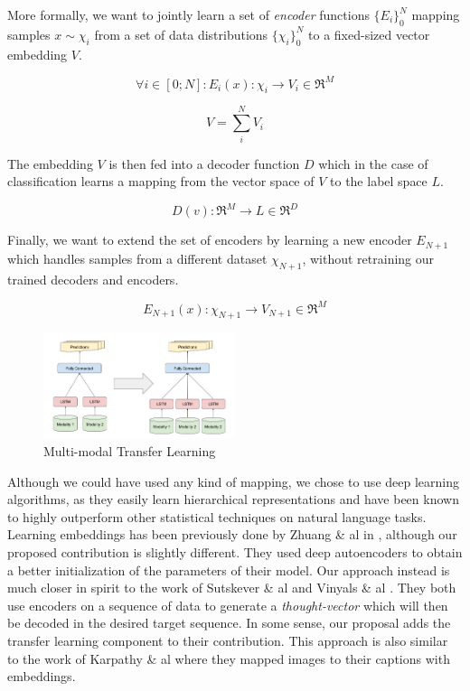 \documentclass[12pt]{article}
\begin{document}
More formally, we want to jointly learn a set of \emph{encoder}
functions $\{E_i\}_0^N$ mapping samples $x \sim \chi_i$ from a set of
data distributions $\{\chi_i\}_0^N$ to a fixed-sized vector embedding
$V$.

\[ \forall i \in [0; N]: E_i(x): \chi_i \rightarrow V_i \in \Re^M\]

\[V = \sum_i^N V_i\]

The embedding $V$ is then fed into a decoder function $D$ which in the
case of classification learns a mapping from the vector space of $V$ to
the label space $L$.

\[ D(v): \Re^M \rightarrow L \in \Re^D\]

Finally, we want to extend the set of encoders by learning a new encoder
$E_{N+1}$ which handles samples from a different dataset $\chi_{N+1}$,
without retraining our trained decoders and encoders.

\[ E_{N+1}(x): \chi_{N+1} \rightarrow V_{N+1} \in \Re^M\]

\begin{figure}[htbp]
\centering
\includegraphics[width=0.5\textwidth]{figures/multimodal.png}
\caption{Multi-modal Transfer Learning}
\end{figure}

Although we could have used any kind of mapping, we chose to use deep
learning algorithms, as they easily learn hierarchical representations
and have been known to highly outperform other statistical techniques on
natural language tasks. Learning embeddings has been previously done by Zhuang \& al in 
\cite{zhuang2015supervised}, although our proposed contribution is
slightly different. They used deep autoencoders to
obtain a better initialization of the parameters of their model. Our
approach instead is much closer in spirit to the work of Sutskever \& al
\cite{sutskever2014sequence} and Vinyals \& al \cite{vinyals2015grammar}. They
both use encoders on a sequence of data to generate a
\emph{thought-vector} which will then be decoded in the desired target
sequence. In some sense, our proposal adds the transfer learning
component to their contribution. This approach is also similar to the
work of Karpathy \& al \cite{karpathy2014deep} where they mapped
images to their captions with embeddings.
\end{document}
